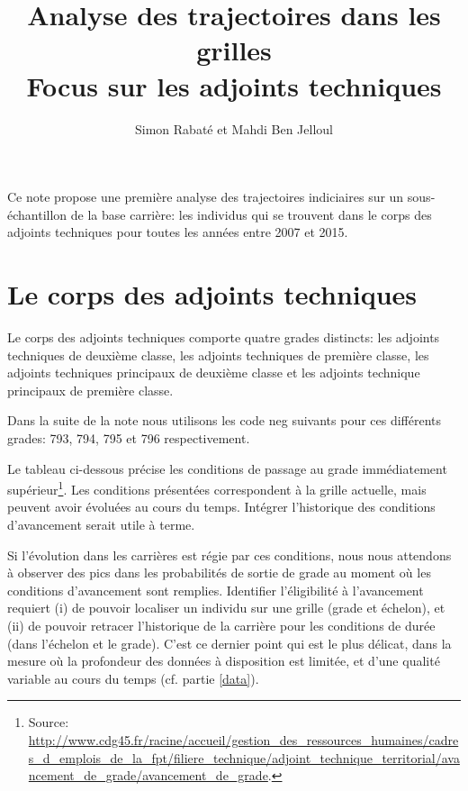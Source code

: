 \documentclass[11pt,a4paper]{article}
\begin{document}
\title{Analyse des trajectoires dans les grilles \\ Focus sur les adjoints techniques}


\author{Simon Rabat\'e et Mahdi Ben Jelloul}


\maketitle

Ce note propose une première analyse des trajectoires indiciaires sur un sous-échantillon de la base carrière: les individus qui se trouvent dans le corps des adjoints techniques pour toutes les années entre 2007 et 2015. 

\renewcommand*\contentsname{\textsc{Plan de la note}}
\tableofcontents

\clearpage


\section{Le corps des adjoints techniques}

Le corps des adjoints techniques comporte quatre grades distincts: les adjoints techniques de deuxième classe, les adjoints techniques de première classe, les adjoints techniques principaux de deuxième classe et les adjoints technique principaux de première classe. 

Dans la suite de la note nous utilisons les code neg suivants pour ces différents grades: 793, 794, 795 et 796 respectivement. 

Le tableau ci-dessous précise les conditions de passage au grade immédiatement supérieur\footnote{Source: \url{http://www.cdg45.fr/racine/accueil/gestion_des_ressources_humaines/cadres_d_emplois_de_la_fpt/filiere_technique/adjoint_technique_territorial/avancement_de_grade/avancement_de_grade}.}. Les conditions présentées correspondent à la grille actuelle, mais peuvent avoir évoluées au cours du temps. Intégrer l'historique des conditions d'avancement serait utile à terme. 

Si l'évolution dans les carrières est régie par ces conditions, nous nous attendons à observer des pics dans les probabilités de sortie de grade au moment où les conditions d'avancement sont remplies. Identifier l'éligibilité à l'avancement requiert (i) de pouvoir localiser un individu sur une grille (grade et échelon), et (ii) de pouvoir retracer l'historique de la carrière pour les conditions de durée (dans l'échelon et le grade). C'est ce dernier point qui est le plus délicat, dans la mesure où la profondeur des données à disposition est limitée, et d'une qualité variable au cours du temps (cf. partie \ref{data}). 
\end{document}
